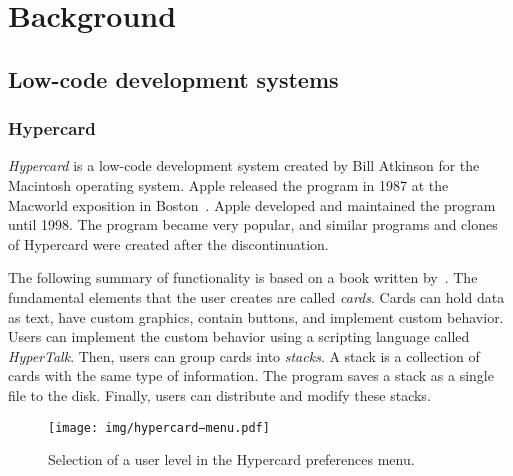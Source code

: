 \chapter{Background}
\label{chap:background}

\section{Low-code development systems}


\subsection{Hypercard}
\emph{Hypercard} is a low-code development system created by Bill Atkinson for the Macintosh operating system. Apple released the program in 1987 at the
Macworld exposition in Boston~\cite{hyper_release}. Apple developed and maintained the program until 1998. The program became very popular, and similar programs and clones of Hypercard were created after the discontinuation.


The following summary of functionality is based on a book written by~\citet{goodman_hypertext}.
The fundamental elements that the user creates are called \emph{cards}. Cards can hold data as text, have custom graphics, contain buttons, and implement custom behavior.
Users can implement the custom behavior using a scripting language called \emph{HyperTalk}. Then, users can group cards into \emph{stacks}. A stack is a collection of cards with the same type of information.
The program saves a stack as a single file to the disk. Finally, users can distribute and modify these stacks.

\begin{figure}
	\centering
	\texttt{[image: img/hypercard−menu.pdf]}
	\caption{Selection of a user level in the Hypercard preferences menu.}
	\label{fig:f}
\end{figure}


